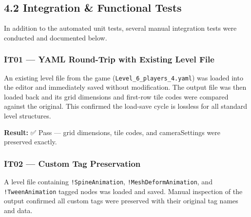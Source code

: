 \begin{Shaded}
\begin{Highlighting}[]
  
             
      
   
\end{Highlighting}
\end{Shaded}

\subsection{4.2 Integration \& Functional
Tests}\label{integration-functional-tests}

In addition to the automated unit tests, several manual integration
tests were conducted and documented below.

\subsubsection{IT01 --- YAML Round-Trip with Existing Level
File}\label{it01-yaml-round-trip-with-existing-level-file}

An existing level file from the game
(\texttt{Level\_6\_players\_4.yaml}) was loaded into the editor and
immediately saved without modification. The output file was then loaded
back and its grid dimensions and first-row tile codes were compared
against the original. This confirmed the load-save cycle is lossless for
all standard level structures.

\textbf{Result:} ✅ Pass --- grid dimensions, tile codes, and
cameraSettings were preserved exactly.

\subsubsection{IT02 --- Custom Tag
Preservation}\label{it02-custom-tag-preservation}

A level file containing \texttt{!SpineAnimation},
\texttt{!MeshDeformAnimation}, and \texttt{!TweenAnimation} tagged nodes
was loaded and saved. Manual inspection of the output confirmed all
custom tags were preserved with their original tag names and data.

